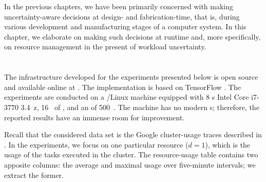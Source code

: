 In the previous chapters, we have been primarily concerned with making
uncertainty-aware decisions at design- and fabrication-time, that is, during
various development and manufacturing stages of a computer system. In this
chapter, we elaborate on making such decisions at runtime and, more
specifically, on resource management in the present of workload uncertainty.

\section{\introductiontitle}

\section{\problemtitle}

\section{\priortitle}

\section{\solutiontitle}

\section{\resultstitle}

The infrastructure developed for the experiments presented below is open source
and available online at \cite{eslab2017b}. The implementation is based on
TensorFlow \cite{abadi2015}. The experiments are conducted on a /Linux
machine equipped with 8 s Intel Core i7-3770 3.4~z, 16~ of
, and an  of 500~. The machine has no modern s;
therefore, the reported results have an immense room for improvement.


Recall that the considered data set is the Google cluster-usage traces
\cite{reiss2011} described in . In the experiments, we focus on one
particular resource ($d = 1$), which is the  usage of the tasks executed
in the cluster. The resource-usage table contains two apposite columns: the
average and maximal  usage over five-minute intervals; we extract the
former.

